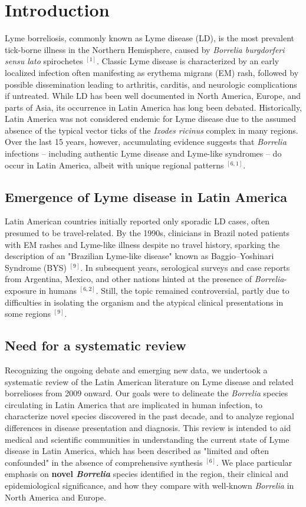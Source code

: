 \documentclass[11pt,letterpaper]{article}
\newcommand{\mycite}[1]{$^{[#1]}$}
\begin{document}
\vspace{0.3cm}
\section{Introduction}
Lyme borreliosis, commonly known as Lyme disease (LD), is the most prevalent tick-borne illness in the Northern Hemisphere, caused by \textit{Borrelia burgdorferi sensu lato} spirochetes \mycite{1}. Classic Lyme disease is characterized by an early localized infection often manifesting as erythema migrans (EM) rash, followed by possible dissemination leading to arthritis, carditis, and neurologic complications if untreated. While LD has been well documented in North America, Europe, and parts of Asia, its occurrence in Latin America has long been debated. Historically, Latin America was not considered endemic for Lyme disease due to the assumed absence of the typical vector ticks of the \textit{Ixodes ricinus} complex in many regions. Over the last 15 years, however, accumulating evidence suggests that \textit{Borrelia} infections – including authentic Lyme disease and Lyme-like syndromes – do occur in Latin America, albeit with unique regional patterns \mycite{6, 1}.

\subsection{Emergence of Lyme disease in Latin America}
Latin American countries initially reported only sporadic LD cases, often presumed to be travel-related. By the 1990s, clinicians in Brazil noted patients with EM rashes and Lyme-like illness despite no travel history, sparking the description of an "Brazilian Lyme-like disease" known as Baggio–Yoshinari Syndrome (BYS) \mycite{9}. In subsequent years, serological surveys and case reports from Argentina, Mexico, and other nations hinted at the presence of \textit{Borrelia}-exposure in humans \mycite{6, 2}. Still, the topic remained controversial, partly due to difficulties in isolating the organism and the atypical clinical presentations in some regions \mycite{9}.

\subsection{Need for a systematic review}
Recognizing the ongoing debate and emerging new data, we undertook a systematic review of the Latin American literature on Lyme disease and related borrelioses from 2009 onward. Our goals were to delineate the \textit{Borrelia} species circulating in Latin America that are implicated in human infection, to characterize novel species discovered in the past decade, and to analyze regional differences in disease presentation and diagnosis. This review is intended to aid medical and scientific communities in understanding the current state of Lyme disease in Latin America, which has been described as "limited and often confounded" in the absence of comprehensive synthesis \mycite{6}. We place particular emphasis on \textbf{novel \textit{Borrelia}} species identified in the region, their clinical and epidemiological significance, and how they compare with well-known \textit{Borrelia} in North America and Europe.
\end{document}
